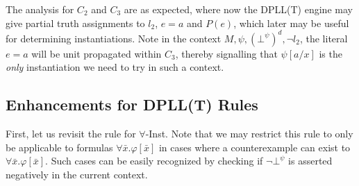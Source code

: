 \documentclass{llncs}
\begin{document}


The analysis for $C_2$ and $C_3$ are as expected, where now the DPLL(T) engine may give partial truth assignments to $l_2$, $e = a$ and $P( e )$, which later may be useful for determining instantiations.
Note in the context $M, \psi, ( \bot^\psi )^d, \neg l_2$, the literal $e = a$ will be unit propagated within $C_3$, thereby signalling that $\psi[a/x]$ is the \emph{only} instantiation we need to try in such a context.

\begin{comment}
We define the following invariant for DPLL(T): \\

{\bf Invariant 1}:
For all DPLL(T) states $M \parallel F$, the only instance of literal $\bot^\psi$ in $F$ occur in clauses $C_1 \ldots C_n$ such that $C_1 \ldots C_n$ is logically equivalent to $( \neg \psi \vee \neg \bot^\psi \vee \neg \psi[\bar{e}/\bar{x}] )$ where $\bar{e} = \mathcal{I}( \psi )$.

It can be shown that counterexample $\forall$-Inst maintains Invariants 1.
Also note that since counterexample literals $\bot^\psi$ have no meaning apart from representing boolean values, no lemma added to $F$ by $T$-Learn will violate Invariant 1.
\end{comment}

\subsection{Enhancements for DPLL(T) Rules}
\label{sec:enhance-dpllt}

First, let us revisit the rule for $\forall$-Inst.
Note that we may restrict this rule to only be applicable to formulas $\forall \bar{x}. \varphi[ \bar{ x } ]$ in cases where a counterexample can exist to $\forall \bar{x}. \varphi[ \bar{ x } ]$.
Such cases can be easily recognized by checking if $\neg \bot^\psi$ is asserted negatively in the current context.
\end{document}
